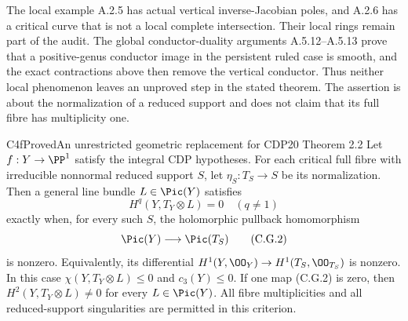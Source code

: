 The local example A.2.5 has actual vertical inverse-Jacobian
poles, and A.2.6 has a critical curve that is not a local
complete intersection. Their local rings remain part of the
audit. The global conductor-duality arguments A.5.12--A.5.13 prove
that a positive-genus conductor image in the persistent ruled
case is smooth, and the exact contractions above then remove
the vertical conductor. Thus neither local phenomenon leaves
an unproved step in the stated theorem. The assertion
is about the normalization of a reduced support and does not
claim that its full fibre has multiplicity one.

\begin{statement}{C4f}{Proved}{An unrestricted geometric replacement for CDP20 Theorem 2.2}
Let $f:Y\to\PP^1$ satisfy the integral CDP hypotheses.
For each critical full fibre with
irreducible nonnormal reduced support $S$, let
$\eta_S:T_S\to S$ be its normalization. Then a general
line bundle $L\in\Pic(Y)$ satisfies
\[
 H^q(Y,T_Y\otimes L)=0\quad(q\ne1)
 \tag{C.G.1}
\]
exactly when, for every such $S$, the holomorphic pullback
homomorphism
\[
 \Pic(Y)\longrightarrow\Pic(T_S)
 \tag{C.G.2}
\]
is nonzero. Equivalently, its differential
$H^1(Y,\OO_Y)\to H^1(T_S,\OO_{T_S})$ is nonzero.
In this case $\chi(Y,T_Y\otimes L)\le0$ and $c_3(Y)\le0$.
If one map (C.G.2) is zero, then
$H^2(Y,T_Y\otimes L)\ne0$ for every $L\in\Pic(Y)$.
All fibre multiplicities and all reduced-support
singularities are permitted in this criterion.
\end{statement}

